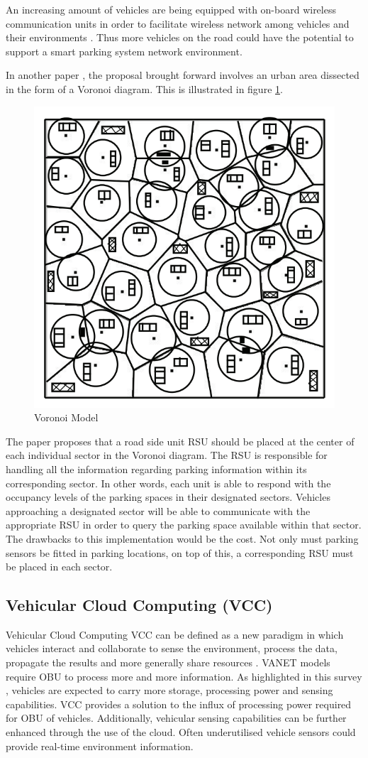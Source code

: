 An increasing amount of vehicles are being equipped with on-board wireless communication units in order to facilitate wireless network among vehicles and their environments \citep{Lin2008SecurityNetworks}. Thus more vehicles on the road could have the potential to support a smart parking system network environment.

In another paper \citep{Panayappan2007VANET-basedAvailability}, the proposal brought forward involves an urban area dissected in the form of a Voronoi diagram. This is illustrated in figure \ref{figure:voronoi}.

\begin{figure}[H]
    \centering
    \includegraphics[width=0.35\linewidth]{./Images/VORONOI.png}
    \caption{Voronoi Model}
    \label{figure:voronoi}
\end{figure}

The paper proposes that a road side unit \ac{RSU} should be placed at the center of each individual sector in the Voronoi diagram. The \ac{RSU} is responsible for handling all the information regarding parking information within its corresponding sector. In other words, each unit is able to respond with the occupancy levels of the parking spaces in their designated sectors. Vehicles approaching a designated sector will be able to communicate with the appropriate \ac{RSU} in order to query the parking space available within that sector. The drawbacks to this implementation would be the cost. Not only must parking sensors be fitted in parking locations, on top of this, a corresponding \ac{RSU} must be placed in each sector.

\subsection{Vehicular Cloud Computing (VCC)}
Vehicular Cloud Computing \ac{VCC} can be defined as a new paradigm in which vehicles interact and collaborate to sense the environment, process the data, propagate the results and more generally share resources \citep{Mehmood2017Cyber-PhysicalCommunications}. \ac{VANET} models require \ac{OBU} to process more and more information. As highlighted in this survey \citep{Whaiduzzaman2014AComputing}, vehicles are expected to carry more storage, processing power and sensing capabilities. \ac{VCC} provides a solution to the influx of processing power required for \ac{OBU} of vehicles. Additionally, vehicular sensing capabilities can be further enhanced through the use of the cloud. Often underutilised vehicle sensors could provide real-time environment information.

